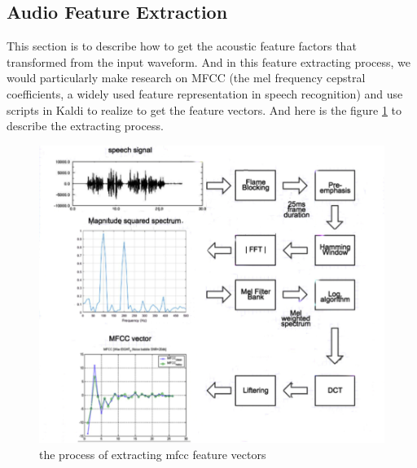 \subsection{Audio Feature Extraction}
This section is to describe how to get the acoustic feature factors that transformed from the input waveform. And in this feature extracting process, we would particularly make research on MFCC \cite{Reference7}(the mel frequency cepstral coefficients, a widely used feature representation in speech recognition) and use scripts in Kaldi to realize to get the feature vectors. And here is the figure \ref{fig:mfccpro} to describe the extracting process.
\begin{figure}[ht]
\includegraphics[width=1\linewidth]{figures/extractmfccprocess.png}
\caption{the process of extracting mfcc feature vectors}
\label{fig:mfccpro}
\end{figure}



